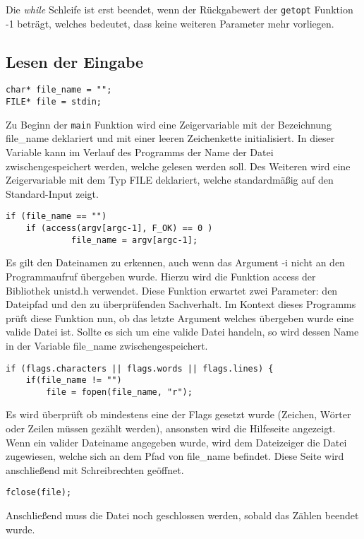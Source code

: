 \documentclass[10pt,a4paper]{article}
\begin{document}
\begin{spacing}{1}
Die {\it while\/} Schleife ist erst beendet, wenn der Rückgabewert der \texttt{getopt} Funktion -1 beträgt, welches bedeutet, dass keine weiteren Parameter mehr vorliegen.

\subsection{Lesen der Eingabe}

\begin{lstlisting}[style=CStyle]
char* file_name = "";
FILE* file = stdin;
\end{lstlisting}

Zu Beginn der \texttt{main} Funktion wird eine Zeigervariable mit der Bezeichnung file\_name deklariert und mit einer leeren Zeichenkette initialisiert. In dieser Variable kann im Verlauf des Programms der Name der Datei zwischengespeichert werden, welche gelesen werden soll.
Des Weiteren wird eine Zeigervariable mit dem Typ FILE deklariert, welche standardmäßig auf den Standard-Input zeigt.

\begin{lstlisting}[style=CStyle]
if (file_name == "")
	if (access(argv[argc-1], F_OK) == 0 )
           	 file_name = argv[argc-1];
\end{lstlisting}

Es gilt den Dateinamen zu erkennen, auch wenn das Argument -i nicht an den Programmaufruf übergeben wurde. Hierzu wird die Funktion access der Bibliothek unistd.h verwendet. Diese Funktion erwartet zwei Parameter: den Dateipfad und den zu überprüfenden Sachverhalt. Im Kontext dieses Programms prüft diese Funktion nun, ob das letzte Argument welches übergeben wurde eine valide Datei ist. Sollte es sich um eine valide Datei handeln, so wird dessen Name in der Variable file\_name zwischengespeichert. 

\begin{lstlisting}[style=CStyle]
if (flags.characters || flags.words || flags.lines) {
    if(file_name != "")
        file = fopen(file_name, "r");
\end{lstlisting}
Es wird überprüft ob mindestens eine der Flags gesetzt wurde (Zeichen, Wörter oder Zeilen müssen gezählt werden), ansonsten wird die Hilfeseite angezeigt.
Wenn ein valider Dateiname angegeben wurde, wird dem Dateizeiger die Datei zugewiesen, welche sich an dem Pfad von file\_name befindet. Diese Seite wird anschließend mit Schreibrechten geöffnet.

\begin{lstlisting}[style=CStyle]
fclose(file);
\end{lstlisting}
Anschließend muss die Datei noch geschlossen werden, sobald das Zählen beendet wurde.


\end{spacing}
\end{document}
